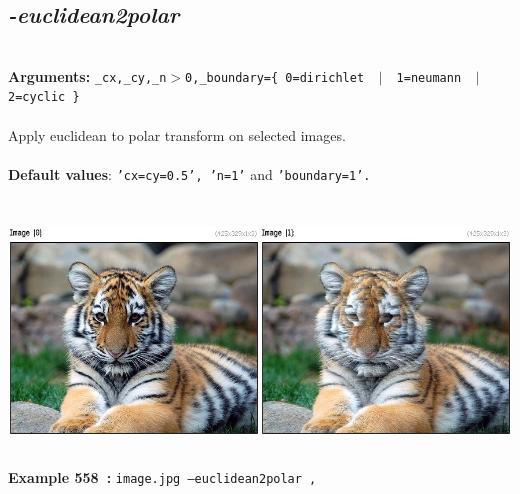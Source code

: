 \documentclass[a4paper,11pt,twoside]{book}
\begin{document}
\subsection{\emph{-euclidean2polar} }\vspace*{-0.5em}
~\\\textbf{Arguments: } 
{\small \texttt{\_cx,\_cy,\_n$>$0,\_boundary=\{ 0=dirichlet ~$|$~ 1=neumann ~$|$~ 2=cyclic \}}}\\~\\
Apply euclidean to polar transform on selected images.
~\\~\\\textbf{Default values}: {\small \texttt{'cx=cy=0.5', 'n=1'} and \texttt{'boundary=1'.}}
\begin{center}\includegraphics[keepaspectratio=true,height=7cm,width=\textwidth]{img/gmic_def558.jpg}\\
{\footnotesize \textbf{Example 558~:} \texttt{image.jpg --euclidean2polar ,}}
\end{center}
\end{document}
